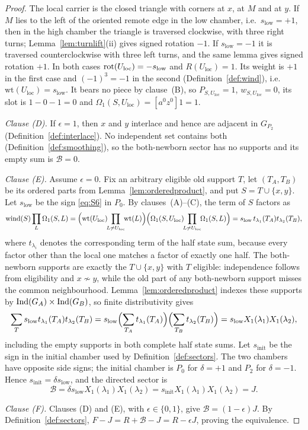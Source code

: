\begin{proof}
The local carrier is the closed triangle with corners at $x$, at $M$ and at
$y$. If $M$ lies to the left of the oriented remote edge in the low chamber,
i.e.\ $s_{\mathrm{low}}=+1$, then in the high chamber the triangle is traversed clockwise,
with three right turns; Lemma~\ref{lem:turnlift}(ii) gives signed rotation
$-1$. If $s_{\mathrm{low}}=-1$ it is traversed counterclockwise with three left turns, and
the same lemma gives signed rotation $+1$. In
both cases $\operatorname{rot}(U_{\mathrm{loc}})=-s_{\mathrm{low}}$ and $R(U_{\mathrm{loc}})=1$. Its weight is $+1$ in the first case
and $(-1)^3=-1$ in the second (Definition~\ref{def:wind}), i.e.\
$\mathrm{wt}(U_{\mathrm{loc}})=s_{\mathrm{low}}$. It bears no piece by clause~(B), so
$P_{S,U_{\mathrm{loc}}}=1$, $w_{S,U_{\mathrm{loc}}}=0$, its slot is $1-0-1=0$ and
$\Omega_1(S,U_{\mathrm{loc}})=[a^0z^0]1=1$.



\emph{Clause (D).} If $\epsilon=1$, then $x$ and $y$ interlace and hence are adjacent in
$G_{P_2}$ (Definition~\ref{def:interlace}). No independent set contains both
(Definition~\ref{def:smoothing}), so the both-newborn sector has no supports
and its empty sum is $\mathcal B=0$.

\emph{Clause (E).} Assume $\epsilon=0$. Fix an arbitrary eligible old support $T$, let
$(T_A,T_B)$ be its ordered parts from Lemma~\ref{lem:orderedproduct}, and put
$S=T\cup\{x,y\}$. Let $s_{\mathrm{low}}$ be the sign \eqref{eq:S6} in $P_0$.
By clauses~(A)--(C), the term of $S$ factors as
\[
\wind(S)\prod_{L}\Omega_1(S,L)
=\Bigl(\mathrm{wt}(U_{\mathrm{loc}})\!\!\prod_{L\neq U_{\mathrm{loc}}}\!\!\mathrm{wt}(L)\Bigr)
 \Bigl(\Omega_1(S,U_{\mathrm{loc}})\!\!\prod_{L\neq U_{\mathrm{loc}}}\!\!\Omega_1(S,L)\Bigr)
=s_{\mathrm{low}}\,t_{\lambda_1}(T_A)t_{\lambda_2}(T_B),
\]
where $t_{\lambda_i}$ denotes the corresponding term of the half state sum,
because every factor other than the local one matches a factor of exactly one
half. The both-newborn supports are exactly the $T\cup\{x,y\}$ with $T$
eligible: independence follows from eligibility and $x\not\sim y$, while the
old part of any both-newborn support misses the common neighbourhood.
Lemma~\ref{lem:orderedproduct} indexes these supports by
$\operatorname{Ind}(G_A)\times\operatorname{Ind}(G_B)$, so finite distributivity gives
\[
 \sum_T s_{\mathrm{low}}t_{\lambda_1}(T_A)t_{\lambda_2}(T_B)
 =s_{\mathrm{low}}\Bigl(\sum_{T_A}t_{\lambda_1}(T_A)\Bigr)
  \Bigl(\sum_{T_B}t_{\lambda_2}(T_B)\Bigr)
 =s_{\mathrm{low}}X_1(\lambda_1)X_1(\lambda_2),
\]
including the empty supports in both complete half state sums. Let
$s_{\mathrm{init}}$ be the sign in the initial chamber used by
Definition~\ref{def:sectors}. The two chambers have opposite side signs; the
initial chamber is $P_0$ for $\delta=+1$ and $P_2$ for $\delta=-1$. Hence
$s_{\mathrm{init}}=\delta s_{\mathrm{low}}$, and the directed sector is
\[
 \mathcal B=\delta s_{\mathrm{low}}X_1(\lambda_1)X_1(\lambda_2)
 =s_{\mathrm{init}}X_1(\lambda_1)X_1(\lambda_2)=J.
\]

\emph{Clause (F).} Clauses (D) and (E), with $\epsilon\in\{0,1\}$, give
$\mathcal B=(1-\epsilon)J$. By Definition~\ref{def:sectors},
$F-J=R+\mathcal B-J=R-\epsilon J$, proving the equivalence.
\end{proof}

